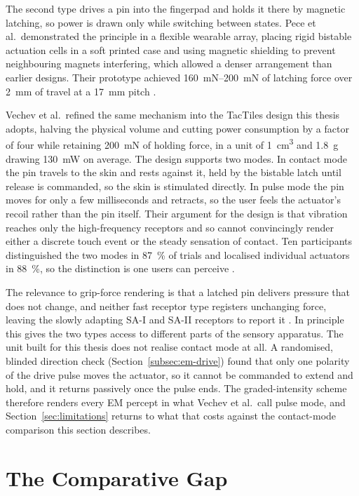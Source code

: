 \documentclass[12pt, a4paper, twoside, openright]{report}
\begin{document}
The second type drives a pin into the fingerpad and holds it there by
magnetic latching, so power is drawn only while switching between states. Pece
et al.\ demonstrated the principle in a flexible wearable array, placing rigid
bistable actuation cells in a soft printed case and using magnetic shielding to
prevent neighbouring magnets interfering, which allowed a denser arrangement
than earlier designs. Their prototype achieved \SIrange{160}{200}{\milli\newton}
of latching force over \SI{2}{\milli\metre} of travel at a \SI{17}{\milli\metre}
pitch \cite{pece2017}.

Vechev et al.\ refined the same mechanism into the TacTiles design this thesis
adopts, halving the physical volume and cutting power consumption by a factor
of four while retaining \SI{200}{\milli\newton} of holding force, in a unit of
\SI{1}{\centi\metre\cubed} and \SI{1.8}{\gram} drawing \SI{130}{\milli\watt}
on average. The design supports two modes. In contact mode the pin travels to
the skin and rests against it, held by the bistable latch until release is
commanded, so the skin is stimulated directly. In pulse mode the pin moves for
only a few milliseconds and retracts, so the user feels the actuator's recoil
rather than the pin itself. Their argument for the design is that vibration
reaches only the high-frequency receptors and so cannot convincingly render
either a discrete touch event or the steady sensation of contact. Ten
participants distinguished the two modes in \SI{87}{\percent} of trials and
localised individual actuators in \SI{88}{\percent}, so the distinction is one
users can perceive \cite{vechev2019}.

The relevance to grip-force rendering is that a latched pin delivers pressure
that does not change, and neither fast receptor type registers unchanging
force, leaving the slowly adapting SA-I and SA-II receptors to report it
\cite{johansson2009}. In principle this gives the two types access to
different parts of the sensory apparatus. The unit built for this thesis does
not realise contact mode at all. A randomised, blinded direction check
(Section~\ref{subsec:em-drive}) found that only one polarity of the drive pulse
moves the actuator, so it cannot be commanded to extend and hold, and it
returns passively once the pulse ends. The graded-intensity scheme therefore
renders every EM percept in what Vechev et al.\ call pulse mode, and
Section~\ref{sec:limitations} returns to what that costs against the
contact-mode comparison this section describes.

\section{The Comparative Gap}
\label{sec:lit-gap}
\end{document}
